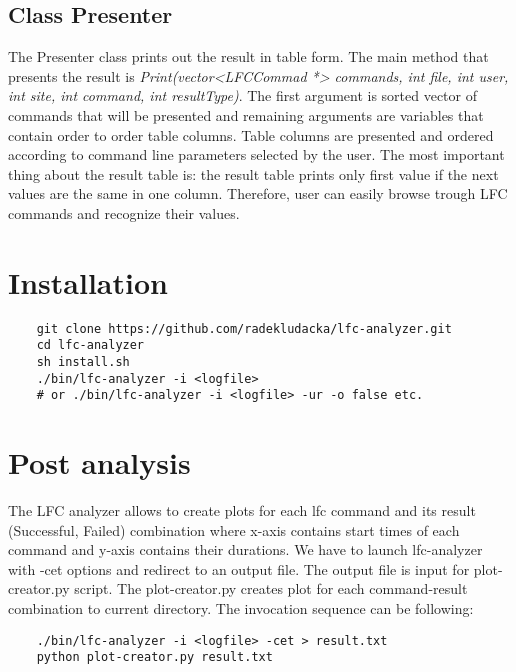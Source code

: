 \documentclass[a4paper, 11pt]{article} %
\begin{document}
\subsection{Class Presenter}
\label{c:presenter}

The Presenter class prints out the result in table form. The main method that presents the result is \textit{Print(vector<LFCCommad *> commands, int file, int user, int site, int command, int resultType)}. The first argument is sorted vector of commands that will be presented and remaining arguments are variables that contain order to order table columns. Table columns are presented and ordered according to command line parameters selected by the user. The most important thing about the result table is: the result table prints only first value if the next values are the same in one column. Therefore, user can easily browse trough LFC commands and recognize their values.


\section*{Installation}

\begin{verbatim}
    git clone https://github.com/radekludacka/lfc-analyzer.git
    cd lfc-analyzer
    sh install.sh
    ./bin/lfc-analyzer -i <logfile>
    # or ./bin/lfc-analyzer -i <logfile> -ur -o false etc.
\end{verbatim}

\section*{Post analysis}

The LFC analyzer allows to create plots for each lfc command and its result (Successful, Failed) combination where x-axis contains 
start times of each command and y-axis contains their durations. We have to launch lfc-analyzer with -cet options and redirect
to an output file. The output file is input for plot-creator.py script. The plot-creator.py creates plot for each
command-result combination to current directory. The invocation sequence can be following:

\begin{verbatim}
    ./bin/lfc-analyzer -i <logfile> -cet > result.txt
    python plot-creator.py result.txt
\end{verbatim}
\end{document}

